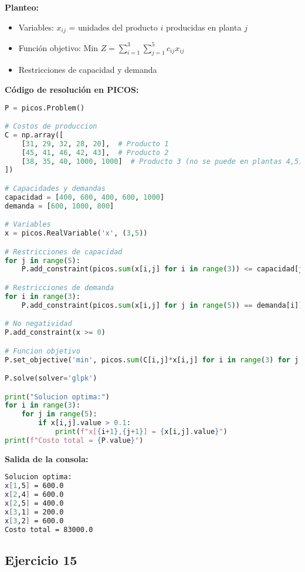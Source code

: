 \documentclass[12pt]{article}
\begin{document}
\textbf{Planteo:}
\begin{itemize}
\item Variables: $x_{ij}$ = unidades del producto $i$ producidas en planta $j$
\item Función objetivo: Min $Z = \sum_{i=1}^3 \sum_{j=1}^5 c_{ij}x_{ij}$
\item Restricciones de capacidad y demanda
\end{itemize}

\textbf{Código de resolución en PICOS:}
\begin{lstlisting}[language=Python]
P = picos.Problem()

# Costos de produccion
C = np.array([
    [31, 29, 32, 28, 20],  # Producto 1
    [45, 41, 46, 42, 43],  # Producto 2
    [38, 35, 40, 1000, 1000]  # Producto 3 (no se puede en plantas 4,5)
])

# Capacidades y demandas
capacidad = [400, 600, 400, 600, 1000]
demanda = [600, 1000, 800]

# Variables
x = picos.RealVariable('x', (3,5))

# Restricciones de capacidad
for j in range(5):
    P.add_constraint(picos.sum(x[i,j] for i in range(3)) <= capacidad[j])

# Restricciones de demanda
for i in range(3):
    P.add_constraint(picos.sum(x[i,j] for j in range(5)) == demanda[i])

# No negatividad
P.add_constraint(x >= 0)

# Funcion objetivo
P.set_objective('min', picos.sum(C[i,j]*x[i,j] for i in range(3) for j in range(5)))

P.solve(solver='glpk')

print("Solucion optima:")
for i in range(3):
    for j in range(5):
        if x[i,j].value > 0.1:
            print(f"x[{i+1},{j+1}] = {x[i,j].value}")
print(f"Costo total = {P.value}")
\end{lstlisting}

\textbf{Salida de la consola:}
\begin{lstlisting}[language=bash,backgroundcolor=\color{black},basicstyle=\color{white}\ttfamily,numbers=none]
Solucion optima:
x[1,5] = 600.0
x[2,4] = 600.0
x[2,5] = 400.0
x[3,1] = 200.0
x[3,2] = 600.0
Costo total = 83000.0
\end{lstlisting}

\subsection{Ejercicio 15}
\end{document}
